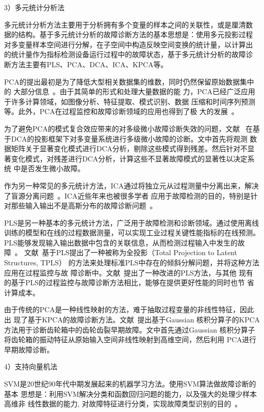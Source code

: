 3）多元统计分析法

多元统计分析方法主要用于分析拥有多个变量的样本之间的关联性，或是厘清数
据的结构。基于多元统计分析的故障诊断方法的基本思想是：使用多元投影过程
对多变量样本空间进行分解，在子空间中构造反映空间变换的统计量，以计算出
的统计量作为指标检测设备运行过程中的故障状态，基于多元统计分析的故障诊
断方法主要有PLS、PCA、DCA、ICA、KPCA等。

PCA的提出最初是为了降低大型相关数据集的维数，同时仍然保留原始数据集中的
大部分信息~\cite{abdi2010principal}。由于其简单的形式和处理大量数据的能
力，PCA已经广泛应用于许多计算领域，如图像分析、特征提取、模式识别、数据
压缩和时间序列预测等。此外，PCA在过程监控和故障诊断领域的应用也得到了极
大的发展~\cite{joe2003statistical, gertler2004pca, choqueuse2012diagnosis}。

为了避免PCA的模式复合效应带来的对多级微小故障诊断失效的问题，文献~
在基于DCA的投影框架下对多变量系统进行多级微小故障的诊断。文中首先将观测
数据矩阵关于显著变化模式进行DCA分析，剔除这些模式得到残差。然后针对不显
著变化模式，对残差进行DCA分析，计算这些不显著故障模式的显著性以决定系统
中是否发生微小故障。

作为另一种常见的多元统计方法，ICA通过将独立元从过程测量中分离出来，解决
了盲源分离问题~\cite{hyvarinen2004independent}。ICA近些年来也被很多学者
应用于故障检测的目的，特别是针对那些输入输出不是高斯分布的故障诊断问题~\cite{kano2003monitoring, lee2004statistical}。

PLS是另一种基本的多元统计方法，广泛用于故障检测和诊断领域。通过使用离线
训练的模型和在线的过程数据测量，可以实现工业过程关键性能指标的在线预测。
PLS能够发现输入输出数据中包含的关联信息，从而检测过程输入中发生的故障~\cite{li2010geometric, zhang2010decentralized, muradore2012pls}。
文献~基于PLS提出了一种被称为全投影（Total Projection to Latent Structures, TPLS）
的方法来处理标准PLS中存在的倾斜分解问题，并将这种方法应用在过程监控与故
障诊断中。文献~提出了一种改进的PLS方法，与其他
现有的基于PLS的过程监控与故障诊断方法相比，能够在提供更好性能的同时也节
省计算成本。

由于传统的PCA是一种线性映射的方法，难于抽取过程变量的非线性特征，因此出
现了基于KPCA的故障诊断方法。文献~提出基于Gaussian
核积分算子的KPCA方法用于诊断齿轮箱中的齿轮齿裂早期故障。文中首先通过Gaussian
核积分算子将齿轮箱的振动特征从原始输入空间非线性映射到高维空间，然后利用
PCA进行早期故障诊断。

4）支持向量机法

SVM是20世纪90年代中期发展起来的机器学习方法。使用SVM算法做故障诊断的基本
思想是：利用SVM解决分类和函数回归问题的能力，以及强大的处理少样本高维非
线性数据的能力, 对故障特征进行分类，实现故障类型识别的目的~\cite{huqiao2006improved}。

